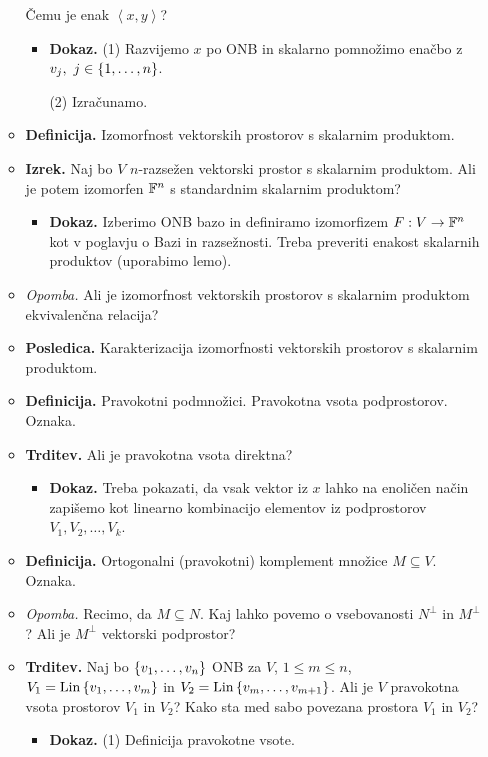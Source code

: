 \begin{enumerate}
\begin{itemize}
        Čemu je enak $\left\langle x, y \right\rangle$?
        \begin{itemize}
            \item \colorbox{green!30}{\textbf{Dokaz.}} (1) Razvijemo $x$ po ONB in skalarno pomnožimo enačbo z $v_j, \ j \in \set{1, \ldots, n}$.
            
            (2) Izračunamo.
        \end{itemize}
        \item \colorbox{purple!30}{\textbf{Definicija.}} Izomorfnost vektorskih prostorov s skalarnim produktom.
        \item \colorbox{blue!30}{\textbf{Izrek.}} Naj bo $V$ $n$-razsežen vektorski prostor s skalarnim produktom. Ali je potem izomorfen $\mathbb{F}^n$ s standardnim skalarnim produktom?
        \begin{itemize}
            \item \colorbox{green!30}{\textbf{Dokaz.}} Izberimo ONB bazo in definiramo izomorfizem $F: V \to \mathbb{F}^n$ kot v poglavju o Bazi in razsežnosti. Treba preveriti enakost skalarnih produktov (uporabimo lemo).
        \end{itemize}
        \item \colorbox{yellow!30}{\emph{Opomba.}} Ali je izomorfnost vektorskih prostorov s skalarnim produktom ekvivalenčna relacija?
        \item \colorbox{orange!30}{\textbf{Posledica.}} Karakterizacija izomorfnosti vektorskih prostorov s skalarnim produktom.
        \item \colorbox{purple!30}{\textbf{Definicija.}} Pravokotni podmnožici. Pravokotna vsota podprostorov. Oznaka.
        \item \colorbox{blue!30}{\textbf{Trditev.}} Ali je pravokotna vsota direktna?
        \begin{itemize}
            \item \colorbox{green!30}{\textbf{Dokaz.}} Treba pokazati, da vsak vektor iz $x$ lahko na enoličen način zapišemo kot linearno kombinacijo elementov iz podprostorov $V_1, V_2, \ldots, V_k$.
        \end{itemize}
        \item \colorbox{purple!30}{\textbf{Definicija.}} Ortogonalni (pravokotni) komplement množice $M \subseteq V$. Oznaka.
        \item \colorbox{yellow!30}{\emph{Opomba.}} Recimo, da $M \subseteq N$. Kaj lahko povemo o vsebovanosti $N^\perp$ in $M^\perp$? Ali je $M^\perp$ vektorski podprostor?
        \item \colorbox{blue!30}{\textbf{Trditev.}} Naj bo $\left\{v_1, \ldots, v_n\right\}$ ONB za $V$, $1 \leq m \leq n$, $V_1 =  \operatorname{Lin} \left\{v_1, \ldots, v_m\right\}$ in $V_2 = \operatorname{Lin} \left\{v_m, \ldots, v_{m+1}\right\}$. Ali je $V$ pravokotna vsota prostorov $V_1$ in $V_2$? Kako sta med sabo povezana prostora $V_1$ in $V_2$?
        \begin{itemize}
            \item \colorbox{green!30}{\textbf{Dokaz.}} (1) Definicija pravokotne vsote.
            

\end{itemize}
\end{itemize}
\end{enumerate}
